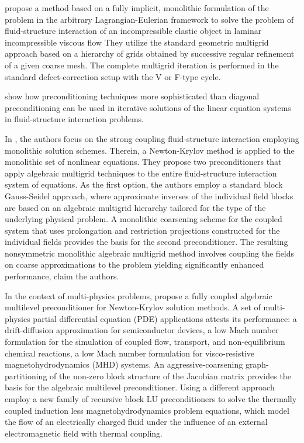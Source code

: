 \cite{hron_monolithic_2006} propose a method based on a fully implicit, monolithic formulation of the problem in the arbitrary Lagrangian-Eulerian framework  to solve the problem of fluid-structure interaction of an incompressible elastic object in laminar incompressible viscous flow
They utilize the standard geometric multigrid approach based on a hierarchy of grids obtained by successive regular refinement of a given coarse mesh.
The complete multigrid iteration is performed in the standard defect-correction setup with the V or F-type cycle.

\cite{tezduyar2006space} show how preconditioning techniques more sophisticated than diagonal preconditioning can be used in iterative solutions of the linear equation systems in fluid-structure interaction problems.

In \cite{gee_truly_2011}, the authors focus on the strong coupling fluid-structure interaction employing monolithic solution schemes.
Therein, a Newton-Krylov method is applied to the monolithic set of nonlinear equations.
They propose two preconditioners that apply algebraic multigrid techniques to the entire fluid-structure interaction system of equations.
As the first option, the authors employ a standard block Gauss-Seidel approach, where approximate inverses of the individual field blocks are based on an algebraic multigrid hierarchy tailored for the type of the underlying physical problem.
A monolithic coarsening scheme for the coupled system that uses prolongation and restriction projections constructed for the individual fields provides the basis for the second preconditioner.
The resulting nonsymmetric monolithic algebraic multigrid method involves coupling the fields on coarse approximations to the problem yielding significantly enhanced performance, claim the authors.

In the context of multi-physics problems, \cite{https://doi.org/10.1002/fld.2402} propose a fully coupled algebraic multilevel preconditioner for Newton-Krylov solution methods.
A set of multi-physics partial differential equation (PDE) applications attests its performance: a drift-diffusion approximation for semiconductor devices,
a low Mach number formulation for the simulation of coupled flow, transport, and non-equilibrium chemical reactions,
a low Mach number formulation for visco-resistive magnetohydrodynamics (MHD) systems.
An aggressive-coarsening graph-partitioning of the non-zero block structure of the Jacobian matrix provides the basis for the algebraic multilevel preconditioner.
Using a different approach \cite{badia_block_2014} employ a new family of recursive block LU preconditioners to solve the thermally coupled induction less magnetohydrodynamics problem equations, which model the flow of an electrically charged fluid under the influence of an external electromagnetic field with thermal coupling.

